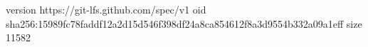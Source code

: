 version https://git-lfs.github.com/spec/v1
oid sha256:15989fc78faddf12a2d15d546f398df24a8ca854612f8a3d9554b332a09a1eff
size 11582
